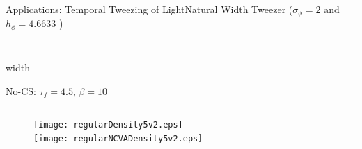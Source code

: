 \begin{frame}[c]{Applications: Temporal Tweezing of Light}{\textcolor{paleblue}{Natural Width Tweezer} ($\sigma_\phi = 2$ and $h_\phi  = 4.6633$ )}
\begin{columns}
\begin{column}{0.75\textwidth}
\hrule width\textwidth 

\vspace{0.5em}
{\small No-CS:  $\tau_f =4.5$, $\beta = 10$ }
\begin{columns}
\begin{column}{0.5\textwidth}
\centering
\vspace{-1em}
\begin{figure}
\hspace{2em}\texttt{[image: regularDensity5v2.eps]}  \\
\vspace{-0.5em}
\hspace{2em}\texttt{[image: regularNCVADensity5v2.eps]} 
\end{figure}
\end{column}
\begin{column}{0.5\textwidth}
\vspace{-0.5em} \raggedright
\hspace{-2em}%
\end{column}
\end{columns}
\end{column}
\end{columns}
\end{frame}

